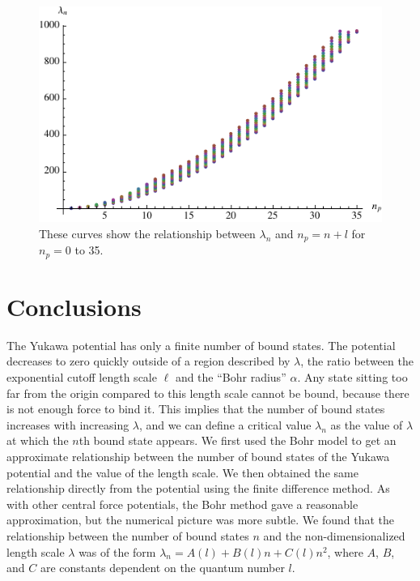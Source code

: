 \documentclass[12pt,twoside]{reedthesis}
\begin{document}
\begin{figure}[h]
\centering
\includegraphics{Figures/alllcs-principal}
\caption[Plots of $\lambda_n$ versus $n + l$ for $l = 0$ to $10$]{These curves show the relationship between $\lambda_n$ and $n_p = n + l$ for $n_p = 0$ to 35.}
\label{fig:alllcs-principal}
\end{figure}


%
%
\chapter*{Conclusions}
	\setcounter{chapter}{4}
	\setcounter{section}{0}

The Yukawa potential has only a finite number of bound states. The potential decreases to zero quickly outside of a region described by $\lambda$, the ratio between the exponential cutoff length scale $\ell$ and the ``Bohr radius'' $\alpha$. Any state sitting too far from the origin compared to this length scale cannot be bound, because there is not enough force to bind it. This implies that the number of bound states increases with increasing $\lambda$, and we can define a critical value $\lambda_n$ as the value of $\lambda$ at which the $n$th bound state appears.
We first used the Bohr model to get an approximate relationship between the number of bound states of the Yukawa potential and the value of the length scale. We then obtained the same relationship directly from the potential using the finite difference method. As with other central force potentials, the Bohr method gave a reasonable approximation, but the numerical picture was more subtle. 
We found that the relationship between the number of bound states $n$ and the non-dimensionalized length scale $\lambda$ was of the form $\lambda_n = A(l) + B(l)n + C(l)n^2$, where $A$, $B$, and $C$ are constants dependent on the quantum number $l$. 
\end{document}
